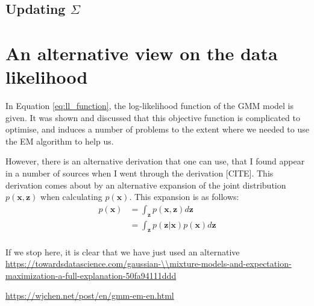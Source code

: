 \documentclass{article}
\begin{document}
\subsection{Updating $\Sigma$}

\section{An alternative view on the data likelihood}

In Equation \eqref{eq:ll_function}, the log-likelihood function of the GMM model is given. It was shown and discussed that this objective function is complicated to optimise, and induces a number of problems to the extent where we needed to use the EM algorithm to help us. 

However, there is an alternative derivation that one can use, that I found appear in a number of sources when I went through the derivation [CITE]. This derivation comes about by an alternative expansion of the joint distribution $p(\mathbf{x}, \mathbf{z})$ when calculating $p(\mathbf{x})$. This expansion is as follows:
\begin{equation}
\begin{aligned}
p(\mathbf{x}) &= \int_{\mathbf{z}} p(\mathbf{x}, \mathbf{z}) d\mathbf{z} \\
&= \int_{\mathbf{z}}p(\mathbf{z}\vert\mathbf{x})p(\mathbf{x})d\mathbf{z} \\
\end{aligned}
\end{equation}

If we stop here, it is clear that we have just used an alternative 
\url{https://towardsdatascience.com/gaussian-\\mixture-models-and-expectation-maximization-a-full-explanation-50fa94111ddd} 

\url{https://wjchen.net/post/en/gmm-em-en.html}
\end{document}
